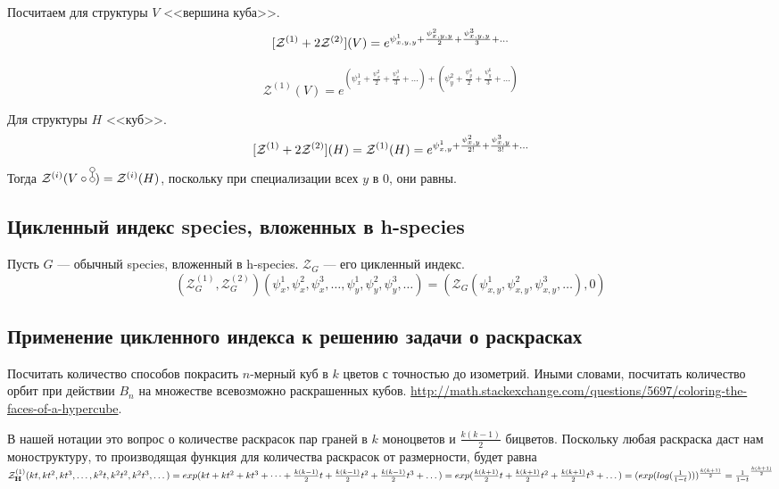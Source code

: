 \begin{example}
Посчитаем для структуры $V$ <<вершина куба>>.
$$
[\mathcal Z^{(1)} + 2\mathcal Z^{(2)}](V) = e^{\psi_{x,y,y}^{1} + \frac{\psi_{x,y,y}^{2}}{2} +
\frac{\psi_{x,y,y}^{3}}{3} + \dots} 
$$

$$
\mathcal Z^{(1)}(V) = e^{(\psi_{x}^{1} + \frac{\psi_{x}^{2}}{2} +
\frac{\psi_{x}^{3}}{3} + \dots) + (\psi_{y}^{2} + \frac{\psi_{y}^{4}}{2} +
\frac{\psi_{y}^{6}}{3} + \dots)} 
$$

Для структуры $H$ <<куб>>.
$$
[\mathcal Z^{(1)} + 2\mathcal Z^{(2)}](H) = \mathcal Z^{(1)}(H) = e^{\psi_{x,y}^{1} +
\frac{\psi_{x,y}^{2}}{2!} + \frac{\psi_{x,y}^{3}}{3!} + \dots} 
$$
Тогда $\mathcal Z^{(i)}(V \circ \dA) = \mathcal Z^{(i)}(H)$, поскольку
при специализации всех $y$ в $0$, они равны.
\end{example}

\subsection{Цикленный индекс species, вложенных в h-species}
\begin{statement}
Пусть $G$ --- обычный species, вложенный в h-species. $\mathcal Z_G$ --- его
цикленный индекс.
$$(\mathcal Z^{(1)}_G, \mathcal Z^{(2)}_G)
(\psi_x^1, \psi_x^2, \psi_x^3, \dots, 
\psi_y^1, \psi_y^2, \psi_y^3, \dots)
 = (\mathcal Z_G(\psi_{x,y}^1, \psi_{x,y}^2, \psi_{x,y}^3, \dots), 0)$$
\end{statement}

\subsection{Применение цикленного индекса к решению задачи о раскрасках}
\begin{problem}
Посчитать количество способов покрасить $n$-мерный куб в $k$ цветов с точностью
до изометрий. Иными словами, посчитать количество орбит при действии $B_n$ на
множестве всевозможно раскрашенных кубов. \url{http://math.stackexchange.com/questions/5697/coloring-the-faces-of-a-hypercube}.
\end{problem}
\begin{solution}
В нашей нотации это вопрос о количестве раскрасок пар граней в $k$ моноцветов и
$\frac{k(k-1)}{2}$ бицветов. Поскольку любая раскраска даст нам моноструктуру,
то производящая функция для количества раскрасок от размерности, будет равна
$\mathcal Z^{(1)}_{\mathbf H}(kt, kt^2, kt^3, \dots, k^2t,
k^2t^2, k^2t^3, \dots) = exp(kt + kt^2 + kt^3 + \dots
+ \frac{k(k-1)}{2}t + \frac{k(k-1)}{2}t^2 + \frac{k(k-1)}{2}t^3 + \dots) =
exp(\frac{k(k+1)}{2}t + \frac{k(k+1)}{2}t^2 + \frac{k(k+1)}{2}t^3 + \dots) =
(exp(log(\frac{1}{1-t})))^{\frac{k(k+1)}{2}} = \frac{1}{1-t}^{\frac{k(k+1)}{2}}$
\end{solution}
